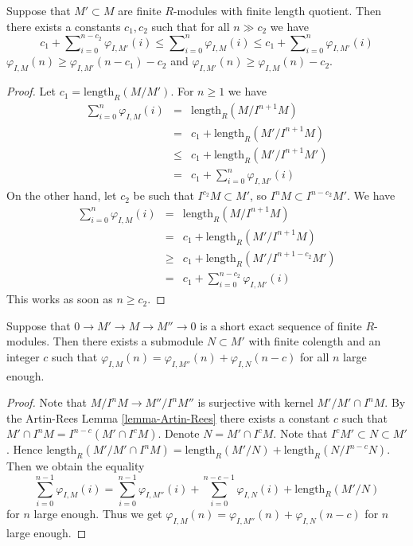 \begin{lemma}
\label{lemma-differ-finite}
Suppose that $M' \subset M$ are finite $R$-modules
with finite length quotient. Then there exists a
constants $c_1, c_2$ such that for all $n \gg c_2$ we have
$$
c_1 + \sum\nolimits_{i = 0}^{n - c_2} \varphi_{I, M'}(i)
\leq
\sum\nolimits_{i = 0}^n \varphi_{I, M}(i)
\leq
c_1 + \sum\nolimits_{i = 0}^n \varphi_{I, M'}(i)
$$
$\varphi_{I, M}(n) \geq \varphi_{I, M'}(n-c_1) - c_2$
and $\varphi_{I, M'}(n) \geq \varphi_{I, M}(n) - c_2$.
\end{lemma}

\begin{proof}
Let $c_1 = \text{length}_R(M/M')$. For $n \geq 1$ we have
\begin{eqnarray*}
\sum\nolimits_{i = 0}^n \varphi_{I, M}(i)
& = &
\text{length}_R(M/I^{n + 1}M) \\
& = &
c_1 + \text{length}_R(M'/I^{n + 1}M) \\
& \leq &
c_1 + \text{length}_R(M'/I^{n + 1}M') \\
& = &
c_1 + \sum\nolimits_{i = 0}^n \varphi_{I, M'}(i)
\end{eqnarray*}
On the other hand, let $c_2$ be such that $I^{c_2}M \subset M'$,
so $I^nM \subset I^{n - c_2}M'$. We have
\begin{eqnarray*}
\sum\nolimits_{i = 0}^n \varphi_{I, M}(i)
& = &
\text{length}_R(M/I^{n + 1}M) \\
& = &
c_1 + \text{length}_R(M'/I^{n + 1}M) \\
& \geq &
c_1 + \text{length}_R(M'/I^{n + 1 - c_2}M') \\
& = &
c_1 + \sum\nolimits_{i = 0}^{n - c_2} \varphi_{I, M'}(i)
\end{eqnarray*}
This works as soon as $n \geq c_2$.
\end{proof}

\begin{lemma}
\label{lemma-hilbert-ses}
Suppose that $0 \to M' \to M \to M'' \to 0$
is a short exact sequence of finite $R$-modules.
Then there exists a submodule $N \subset M'$ with
finite colength and an integer $c$ such that $\varphi_{I, M}(n)
= \varphi_{I, M''}(n) + \varphi_{I, N}(n-c)$ for all $n$ large enough.
\end{lemma}

\begin{proof}
Note that $M/I^nM \to M''/I^nM''$ is surjective
with kernel $M' / M' \cap I^nM$. By the Artin-Rees
Lemma \ref{lemma-Artin-Rees} there exists a
constant $c$ such that $M' \cap I^nM =
I^{n-c}(M' \cap I^cM)$. Denote $N = M' \cap I^cM$.
Note that $I^c M' \subset N \subset M'$.
Hence $\text{length}_R(M' / M' \cap I^nM)
= \text{length}_R(M'/N) + \text{length}_R(N/I^{n-c}N)$.
Then we obtain the equality
$$
\sum_{i = 0}^{n-1} \varphi_{I, M}(i)
=
\sum_{i = 0}^{n-1} \varphi_{I, M''}(i)
+
\sum_{i = 0}^{n-c-1} \varphi_{I, N}(i)
+
\text{length}_R(M'/N)
$$
for $n$ large enough. Thus we get $\varphi_{I, M}(n)
= \varphi_{I, M''}(n) + \varphi_{I, N}(n-c)$ for
$n$ large enough.
\end{proof}

